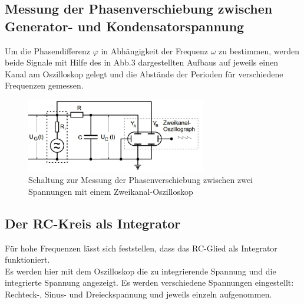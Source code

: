 \subsection{Messung der Phasenverschiebung zwischen Generator- und Kondensatorspannung}

Um die Phasendifferenz $\varphi$ in Abhängigkeit der Frequenz $\omega$
zu bestimmen, werden beide Signale mit Hilfe des in Abb.3 dargestellten Aufbaus auf jeweils einen Kanal am Oszilloskop gelegt und die Abstände der Perioden für verschiedene Frequenzen gemessen.
\begin{figure}[h]
  \centering
  \includegraphics[width=0.7\textwidth]{Grafiken/V353_Abb3.jpg}
  \caption{Schaltung zur Messung der Phasenverschiebung zwischen zwei Spannungen mit einem Zweikanal-Oszilloskop \cite{Versuchsaufbau}}
  \label{fig:V353_Abb3}
\end{figure}
\subsection{Der RC-Kreis als Integrator}
Für hohe Frequenzen lässt sich feststellen, dass das RC-Glied als Integrator funktioniert.\\
Es werden hier mit dem Oszilloskop die zu integrierende Spannung und die integrierte Spannung angezeigt. Es werden verschiedene Spannungen
eingestellt: Rechteck-, Sinus- und Dreieckspannung und jeweils einzeln aufgenommen.
